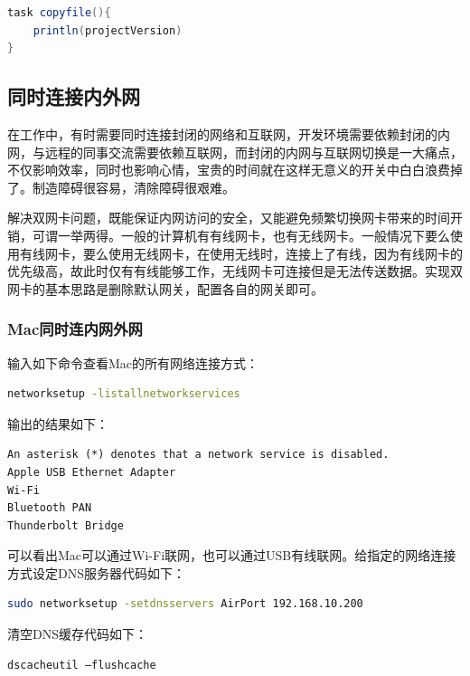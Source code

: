 \documentclass[letter]{book}
\begin{document}
\begin{lstlisting}[language=Java]
task copyfile(){
	println(projectVersion)
}
\end{lstlisting}


\subsection{同时连接内外网}

在工作中，有时需要同时连接封闭的网络和互联网，开发环境需要依赖封闭的内网，与远程的同事交流需要依赖互联网，而封闭的内网与互联网切换是一大痛点，不仅影响效率，同时也影响心情，宝贵的时间就在这样无意义的开关中白白浪费掉了。制造障碍很容易，清除障碍很艰难。

解决双网卡问题，既能保证内网访问的安全，又能避免频繁切换网卡带来的时间开销，可谓一举两得。一般的计算机有有线网卡，也有无线网卡。一般情况下要么使用有线网卡，要么使用无线网卡，在使用无线时，连接上了有线，因为有线网卡的优先级高，故此时仅有有线能够工作，无线网卡可连接但是无法传送数据。实现双网卡的基本思路是删除默认网关，配置各自的网关即可。

\subsubsection{Mac同时连内网外网}

输入如下命令查看Mac的所有网络连接方式：

\begin{lstlisting}[language=Bash]
networksetup -listallnetworkservices
\end{lstlisting}

输出的结果如下：

\begin{lstlisting}
An asterisk (*) denotes that a network service is disabled.
Apple USB Ethernet Adapter
Wi-Fi
Bluetooth PAN
Thunderbolt Bridge
\end{lstlisting}

可以看出Mac可以通过Wi-Fi联网，也可以通过USB有线联网。给指定的网络连接方式设定DNS服务器代码如下：

\begin{lstlisting}[language=Bash]
sudo networksetup -setdnsservers AirPort 192.168.10.200
\end{lstlisting}

清空DNS缓存代码如下：

\begin{lstlisting}[language=Bash]
dscacheutil –flushcache
\end{lstlisting}
\end{document}
